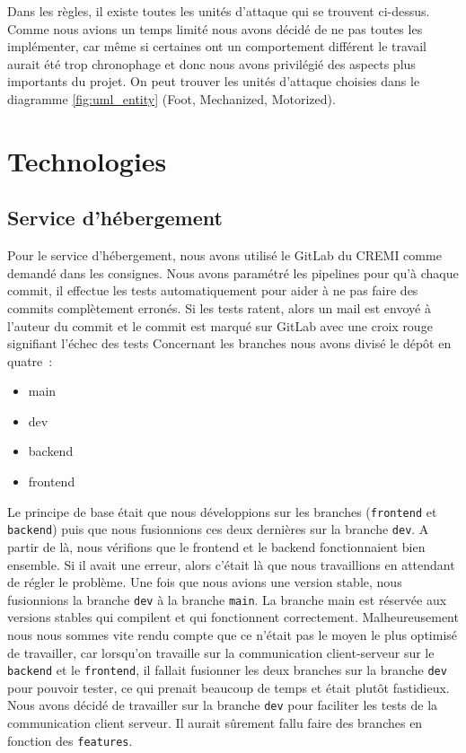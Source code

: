 Dans les règles, il existe toutes les unités d'attaque qui se trouvent ci-dessus. Comme nous avions un temps limité nous avons décidé de ne pas toutes les implémenter, car même si certaines ont un comportement différent le travail aurait été trop chronophage et donc nous avons privilégié des aspects plus importants du projet. On peut trouver les unités d'attaque choisies dans le diagramme \ref{fig:uml_entity} (Foot, Mechanized, Motorized).

\section{Technologies}

\subsection{Service d'hébergement}

Pour le service d'hébergement, nous avons utilisé le GitLab du CREMI comme demandé dans les consignes. Nous avons paramétré les pipelines pour qu'à chaque commit, il effectue les tests automatiquement pour aider à ne pas faire des commits complètement erronés.
Si les tests ratent, alors un mail est envoyé à l'auteur du commit et le commit est marqué sur GitLab avec une croix rouge signifiant l'échec des tests Concernant les branches nous avons divisé le dépôt en quatre :
\begin{itemize}
    \item main
    \item dev
    \item backend
    \item frontend
\end{itemize}

Le principe de base était que nous développions sur les branches (\lstinline{frontend} et \lstinline{backend}) puis que nous fusionnions ces deux dernières sur la branche \lstinline{dev}. A partir de là, nous vérifions que le frontend et le backend fonctionnaient bien ensemble. Si il avait une erreur, alors c'était là que nous travaillions en attendant de régler le problème. Une fois que nous avions une version stable, nous fusionnions la branche \lstinline{dev} à la branche \lstinline{main}. La branche main est réservée aux versions stables qui compilent et qui fonctionnent correctement. Malheureusement nous nous sommes vite rendu compte que ce n'était pas le moyen le plus optimisé de travailler, car lorsqu'on travaille sur la communication client-serveur sur le \lstinline{backend} et le \lstinline{frontend}, il fallait fusionner les deux branches sur la branche \lstinline{dev} pour pouvoir tester, ce qui prenait beaucoup de temps et était plutôt fastidieux. Nous avons décidé de travailler sur la branche \lstinline{dev} pour faciliter les tests de la communication client serveur. Il aurait sûrement fallu faire des branches en fonction des {\tt features}.

